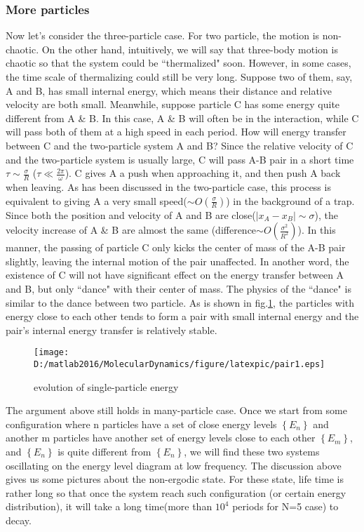 \documentclass[aps,pre,twocolumn
,groupedaddress]{revtex4-1}
\begin{document}
\subsubsection{More particles}
Now let's consider the three-particle case. For two particle, the motion is non-chaotic. On the other hand, intuitively, we will say that three-body motion is chaotic so that the system could be ``thermalized" soon. However, in some cases, the time scale of thermalizing could still be very long. Suppose two of them, say, A and B, has small internal energy, which means their distance and relative velocity are both small. Meanwhile, suppose particle C has some energy quite different from A \& B. In this case, A \& B will often be in the interaction, while C will pass both of them at a high speed in each period. How will energy transfer between C and the two-particle system A and B? Since the relative velocity of C and the two-particle system is usually large, C will pass A-B pair in a short time $\tau\sim\frac{\sigma}{R}$ ($\tau\ll\frac{2\pi}{\omega}$). C gives A a push when approaching it, and then push A back when leaving.  As has been discussed in the two-particle case, this process is equivalent to giving A a very small speed($\sim O(\frac{\sigma}{R})$) in the background of a trap. Since both the position and velocity of A and B are close($|x_A-x_B|\sim\sigma$), the velocity increase of A \& B are almost the same (difference$\sim O(\frac{\sigma^2}{R^2})$). In this manner, the passing of particle C only kicks the center of mass of the A-B pair slightly, leaving the internal motion of the pair unaffected. In another word, the existence of C will not have significant effect on the energy transfer between A and B, but only ``dance" with their center of mass. The physics of the ``dance" is similar to the dance between two particle. As is shown in fig.\ref{fig:thermalization4}, the particles with energy close to each other tends to form a pair with small internal energy and the pair's internal energy transfer is relatively stable. %

\begin{figure}[hbtp]
\centering
\texttt{[image: D:/matlab2016/MolecularDynamics/figure/latexpic/pair1.eps]}
\caption{evolution of single-particle energy}
\label{fig:thermalization4}
\end{figure}

The argument above still holds in many-particle case. Once we start from some configuration where n particles have a set of close energy levels $\left\lbrace E_n\right\rbrace $ and another m particles have another set of energy levels close to each other $\left\lbrace E_m\right\rbrace $, and $\left\lbrace E_n\right\rbrace $ is quite different from $\left\lbrace E_n\right\rbrace $, we will find these two systems oscillating on the energy level diagram at low frequency. 
The discussion above gives us some pictures about the non-ergodic state. For these state, life time is rather long so that once the system reach such configuration (or certain energy distribution), it will take a long time(more than $10^4$ periods for N=5 case) to decay. 
\end{document}
